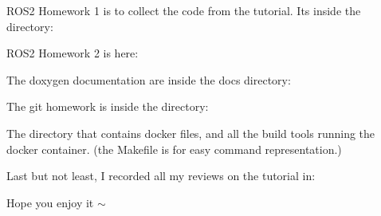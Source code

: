 \begin{DoxyEnumerate}
\item ROS2 Homework 1 is to collect the code from the tutorial. It\textquotesingle{}s inside the directory\+: 
\begin{DoxyCode}{0}

\end{DoxyCode}

\item ROS2 Homework 2 is here\+: 
\begin{DoxyCode}{0}

\end{DoxyCode}

\item The doxygen documentation are inside the docs directory\+: 
\begin{DoxyCode}{0}

\end{DoxyCode}

\item The git homework is inside the directory\+: 
\begin{DoxyCode}{0}

\end{DoxyCode}

\item The directory that contains docker files, and all the build tools running the docker container. (the {\ttfamily Makefile} is for easy command representation.) 
\begin{DoxyCode}{0}

\end{DoxyCode}

\item Last but not least, I recorded all my reviews on the tutorial in\+: 
\begin{DoxyCode}{0}

\end{DoxyCode}

\end{DoxyEnumerate}

Hope you enjoy it $\sim$ 